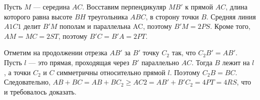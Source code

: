 Пусть $M$ --- середина $AC$. Восставим перпендикуляр $MB'$ к прямой $AC$, длина которого равна высоте $BH$ треугольника $ABC$, в сторону точки $B$. Средняя линия $A1C1$ делит $B'M$ пополам и параллельна AC, поэтому $B'M = 2PS.$ Кроме того, $AM = MC = 2ST$, поэтому $B'C = B'A = 2PT.$

Отметим на продолжении отрезка $AB'$ за $B'$ точку $C_2$ так, что $C_2B' = AB'.$ Пусть $l$ --- это прямая, проходящая через $B'$ параллельно $AC$. Тогда $B$ лежит на $l$, а точки $C_2$ и $C$ симметричны относительно прямой $l$. Поэтому $C_2B = BC.$ Следовательно, $AB+BC = AB+BC_2 \geq AC2 = AB'+B'C_2 = 4PT = 4RS$, что и требовалось доказать.